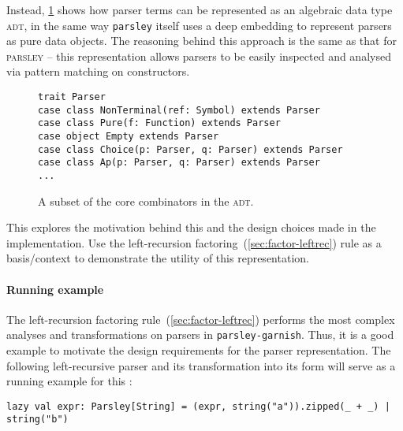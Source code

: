 \documentclass[../../main.tex]{subfiles}
\begin{document}
Instead, \cref{fig:parser-adt} shows how parser terms can be represented as an algebraic data type \textsc{adt}, in the same way \texttt{parsley} itself uses a deep embedding to represent parsers as pure data objects.
The reasoning behind this approach is the same as that for \textsc{parsley} -- this representation allows parsers to be easily inspected and analysed via pattern matching on constructors.

\begin{figure}[htbp]
\begin{verbatim}
trait Parser
case class NonTerminal(ref: Symbol) extends Parser
case class Pure(f: Function) extends Parser
case object Empty extends Parser
case class Choice(p: Parser, q: Parser) extends Parser
case class Ap(p: Parser, q: Parser) extends Parser
...
\end{verbatim}
\caption{A subset of the core combinators in the  \textsc{adt}.}
\label{fig:parser-adt}
\end{figure}


This  explores the motivation behind this and the design choices made in the implementation.
Use the left-recursion factoring~(\cref{sec:factor-leftrec}) rule as a basis/context to demonstrate the utility of this representation.


\paragraph{Running example}
The left-recursion factoring rule~(\cref{sec:factor-leftrec}) performs the most complex analyses and transformations on parsers in \texttt{parsley-garnish}.
Thus, it is a good example to motivate the design requirements for the parser representation.
The following left-recursive parser and its transformation into its  form will serve as a running example for this :
\begin{verbatim}
lazy val expr: Parsley[String] = (expr, string("a")).zipped(_ + _) | string("b")
\end{verbatim}
\end{document}
